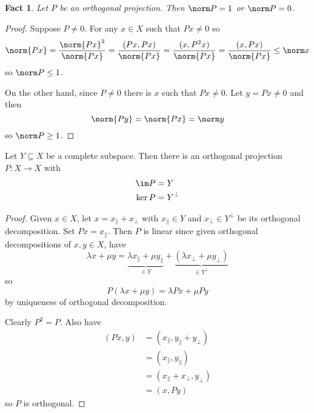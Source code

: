 \documentclass[a4paper]{article}
\newtheorem*{fact}{Fact}
\begin{document}
\begin{fact}
  Let \(P\) be an orthogonal projection. Then \(\norm P = 1\) or \(\norm P = 0\).
\end{fact}

\begin{proof}
  Suppose \(P \neq 0\). For any \(x \in X\) such that \(Px \neq 0\) so
  \[
    \norm{Px}
    = \frac{\norm{Px}^2}{\norm{Px}}
    = \frac{(Px, Px)}{\norm{Px}}
    = \frac{(x, P^2x)}{\norm{Px}}
    = \frac{(x, Px)}{\norm{Px}}
    \leq \norm x
  \]
  so \(\norm P \leq 1\).

  On the other hand, since \(P \neq 0\) there is \(x\) such that \(P x \neq 0\). Let \(y = Px \neq 0\) and then
  \[
    \norm{Py} = \norm{Px} = \norm y
  \]
  so \(\norm P \geq 1\).
\end{proof}

\begin{corollary}
  Let \(Y \subseteq X\) be a complete subspace. Then there is an orthogonal projection \(P: X \to X\) with
  \begin{align*}
    \im P &= Y \\
    \ker P &= Y^\perp
  \end{align*}
\end{corollary}

\begin{proof}
  Given \(x \in X\), let \(x = x_\parallel + x_\perp\) with \(x_\parallel \in Y\) and \(x_\perp \in Y^\perp\) be its orthogonal decomposition. Set \(Px = x_\parallel\). Then \(P\) is linear since given orthogonal decompositions of \(x, y \in X\), have
  \[
    \lambda x + \mu y
    = \underbrace{\lambda x_\parallel + \mu y_\parallel}_{\in Y} + \underbrace{(\lambda x_\perp + \mu y_\perp)}_{\in Y^\perp}
  \]
  so
  \[
    P(\lambda x + \mu y) = \lambda Px + \mu Py
  \]
  by uniqueness of orthogonal decomposition.

  Clearly \(P^2 = P\). Also have
  \begin{align*}
    (Px, y)
    &= (x_\parallel, y_\parallel + y_\perp) \\
    &= (x_\parallel, y_\parallel) \\
    &= (x_\parallel + x_\perp, y_\perp) \\
    &= (x, Py)
  \end{align*}
  so \(P\) is orthogonal.
\end{proof}
\end{document}
